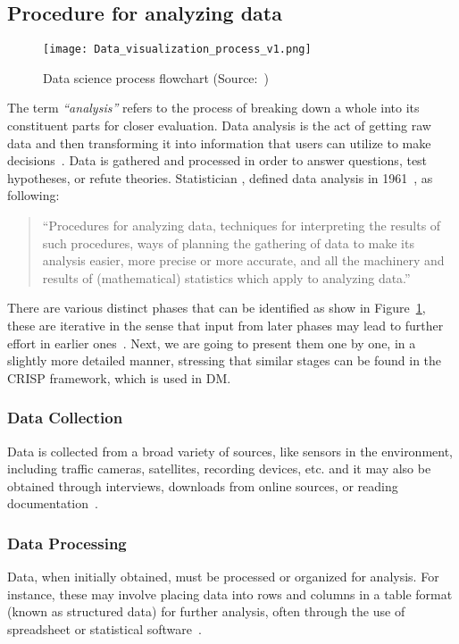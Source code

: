 \subsection{Procedure for analyzing data}
\label{subsect:data_analysis_proc}
\begin{figure}[ht]
    \centering
    \texttt{[image: Data\_visualization\_process\_v1.png]}
    \caption{Data science process flowchart (Source:~\cite{Book:doing_data_science})}
    \label{fig:data-science-flowchart}
\end{figure}
The term \textit{``analysis''} refers to the process of breaking down a whole into its constituent parts for closer evaluation.
Data analysis is the act of getting raw data and then transforming it into information that users can utilize to make decisions~\cite{Book:sbrown_2014_transforming}.
Data is gathered and processed in order to answer questions, test hypotheses, or refute theories.
Statistician \citeauthor{Article:future_of_data_tukey}, defined data analysis in 1961~\cite{Article:future_of_data_tukey}, as following:
\begin{quote}
    ``Procedures for analyzing data, techniques for interpreting the results of such procedures, ways of planning the gathering of data to make its analysis easier,
    more precise or more accurate, and all the machinery and results of (mathematical) statistics which apply to analyzing data.''
\end{quote}
There are various distinct phases that can be identified as show in Figure~\ref{fig:data-science-flowchart}, these are iterative in the sense that input from later phases may lead to further effort in earlier ones~\cite{Book:doing_data_science}.
Next, we are going to present them one by one, in a slightly more detailed manner, stressing that similar stages can be found in the \ac{CRISP} framework, which is used in \acl{DM}.

\subsubsection{Data Collection}
Data is collected from a broad variety of sources, like sensors in the environment, including traffic cameras, satellites, recording devices, etc. and
it may also be obtained through interviews, downloads from online sources, or reading documentation~\cite{Book:doing_data_science}.

\subsubsection{Data Processing}
Data, when initially obtained, must be processed or organized for analysis.
For instance, these may involve placing data into rows and columns in a table format (known as structured data) for further analysis, often through the use of spreadsheet or statistical software~\cite{Book:doing_data_science}.

